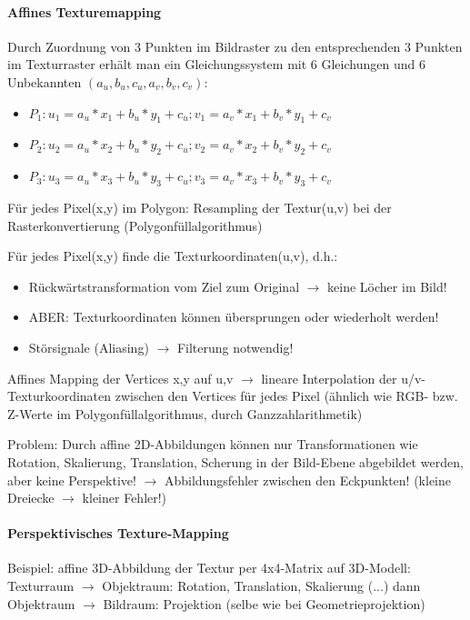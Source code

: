 \documentclass[10pt,landscape]{article}
\begin{document}
\begin{multicols}{3}
\paragraph{Affines Texturemapping}
Durch Zuordnung von 3 Punkten im Bildraster zu den entsprechenden 3 Punkten im Texturraster erhält man ein Gleichungssystem mit 6 Gleichungen und 6 Unbekannten $(a_u , b_u , c_u , a_v , b_v , c_v )$:
\begin{itemize}
  \item $P_1: u_1=a_u*x_1+b_u*y_1+c_u; v_1=a_v*x_1+b_v*y_1+c_v$
  \item $P_2: u_2=a_u*x_2+b_u*y_2+c_u; v_2=a_v*x_2+b_v*y_2+c_v$
  \item $P_3: u_3=a_u*x_3+b_u*y_3+c_u; v_3=a_v*x_3+b_v*y_3+c_v$
\end{itemize}

Für jedes Pixel(x,y) im Polygon: Resampling der Textur(u,v) bei der Rasterkonvertierung (Polygonfüllalgorithmus)

Für jedes Pixel(x,y) finde die Texturkoordinaten(u,v), d.h.:
\begin{itemize}
  \item Rückwärtstransformation vom Ziel zum Original $\rightarrow$ keine Löcher im Bild!
  \item ABER: Texturkoordinaten können übersprungen oder wiederholt werden!
  \item Störsignale (Aliasing) $\rightarrow$ Filterung notwendig!
\end{itemize}

Affines Mapping der Vertices x,y auf u,v $\rightarrow$ lineare Interpolation der u/v-Texturkoordinaten zwischen den Vertices für jedes Pixel (ähnlich wie RGB- bzw. Z-Werte im Polygonfüllalgorithmus, durch Ganzzahlarithmetik)


Problem: Durch affine 2D-Abbildungen können nur Transformationen wie Rotation, Skalierung, Translation, Scherung in der Bild-Ebene abgebildet werden, aber keine Perspektive! $\rightarrow$ Abbildungsfehler zwischen den Eckpunkten! (kleine Dreiecke $\rightarrow$ kleiner Fehler!)

\paragraph{Perspektivisches Texture-Mapping}
Beispiel: affine 3D-Abbildung der Textur per 4x4-Matrix auf 3D-Modell: 
Texturraum $\rightarrow$ Objektraum: Rotation, Translation, Skalierung (...) dann Objektraum $\rightarrow$ Bildraum: Projektion (selbe wie bei Geometrieprojektion)


\end{multicols}
\end{document}
